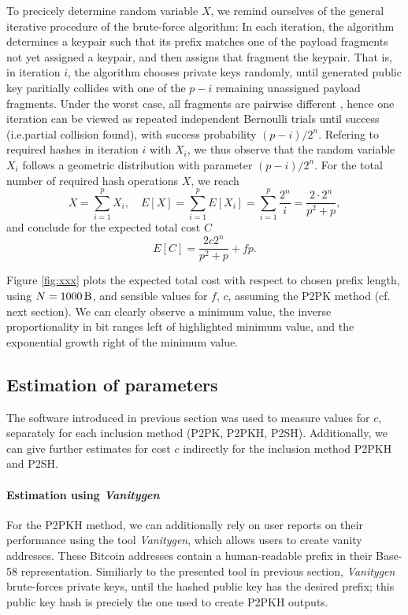 \documentclass[10pt,a4paper,twocolumn]{article}
\begin{document}
To precicely determine random variable $X$, we remind ourselves of the general iterative procedure of the brute-force algorithm:
In each iteration, the algorithm determines a keypair such that its prefix matches one of the payload fragments not yet assigned a keypair, and then assigns that fragment the keypair.
That is, in iteration $i$, the algorithm chooses private keys randomly, until generated public key paritially collides with one of the $p-i$ remaining unassigned payload fragments.
Under the worst case, all fragments are pairwise different%
, hence one iteration can be viewed as repeated independent Bernoulli trials until success (i.e.\@ partial collision found), with success probability $(p-i)/2^n$.  
Refering to required hashes in iteration $i$ with $X_i$, we thus observe that the random variable $X_i$ follows a geometric distribution with parameter $(p-i)/2^n$.
For the total number of required hash operations $X$, we reach
\[ X = \sum_{i=1}^{p} X_i, \quad E[X] = \sum_{i=1}^{p} E[X_i] = \sum_{i=1}^{p}\frac{2^n}{i} = \frac{2\cdot 2^{n}}{p^2+p}, \]
and conclude for the expected total cost $C$
\begin{equation}
    E[C] = \frac{2c2^{n}}{p^2+p} + fp.\label{eq:totalcost}
\end{equation}

Figure \ref{fig:xxx} plots the expected total cost with respect to chosen prefix length, using $N=\SI{1000}{\byte}$, and sensible values for $f$, $c$, assuming the {P2PK} method (cf. next section).
We can clearly observe a minimum value, the inverse proportionality in bit ranges left of highlighted minimum value, and the exponential growth right of the minimum value.

\subsection{Estimation of parameters}


The software introduced in previous section was used to measure values for $c$, separately for each inclusion method ({P2PK, P2PKH, P2SH}).
Additionally, we can give further estimates for cost $c$ indirectly for the inclusion method {P2PKH} and {P2SH}.

\paragraph{Estimation using \emph{Vanitygen}}
For the {P2PKH} method, we can additionally rely on user reports on their performance using the tool \emph{Vanitygen}, which allows users to create vanity addresses.
These Bitcoin addresses contain a human-readable prefix in their Base-58 representation.
Similiarly to the presented tool in previous section, \emph{Vanitygen} brute-forces private keys, until the hashed public key has the desired prefix;
this public key hash is preciely the one used to create {P2PKH} outputs.
\end{document}

